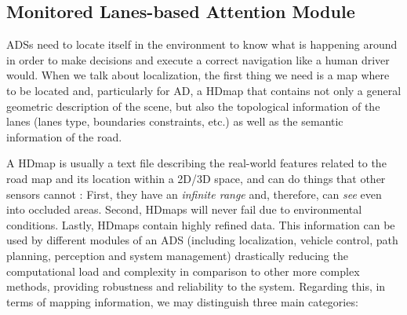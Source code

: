 \subsection{Monitored Lanes-based Attention Module}
\label{subsec:4_smartmot_mlam}

\acp{ADS} need to locate itself in the environment to know what is happening around in order to make decisions and execute a correct navigation like a human driver would. When we talk about localization, the first thing we need is a map where to be located and, particularly for \ac{AD}, a \ac{HDmap} that contains not only a general geometric description of the scene, but also the topological information of the lanes (lanes type, boundaries constraints, etc.) as well as the semantic information of the road. 

A \ac{HDmap} is usually a text file describing the real-world features related to the road map and its location within a 2D/3D space, and can do things that other sensors cannot \cite{wong2020mapping}: First, they have an \textit{infinite range} and, therefore, can \textit{see} even into occluded areas. Second, \acp{HDmap} will never fail due to environmental conditions. Lastly, \acp{HDmap} contain highly refined data. This information can be used by different modules of an \ac{ADS} (including localization, vehicle control, path planning, perception and system management) drastically reducing the computational load and complexity in comparison to other more complex methods, providing robustness and reliability to the system. Regarding this, in terms of mapping information, we may distinguish three main categories:


